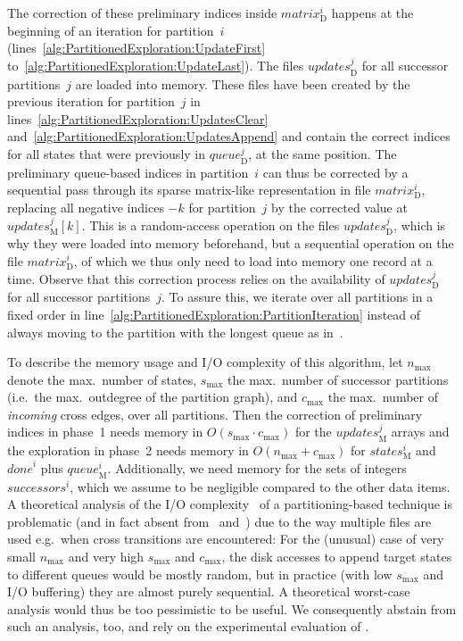 \documentclass{llncs}
\newcommand{\eg}{e.g.\ }
\newcommand{\ie}{i.e.\ }
\begin{document}
The correction of these preliminary indices inside $\mathit{matrix}_\mathrm{D}^i$ happens at the beginning of an iteration for partition~$i$ (lines~\ref{alg:PartitionedExploration:UpdateFirst} to~\ref{alg:PartitionedExploration:UpdateLast}).
The files $\mathit{updates}_\mathrm{D}^j$ for all successor partitions~$j$ are loaded into memory.
These files have been created by the previous iteration for partition~$j$ in lines~\ref{alg:PartitionedExploration:UpdatesClear} and~\ref{alg:PartitionedExploration:UpdatesAppend} and contain the correct indices for all states that were previously in $\mathit{queue}_\mathrm{D}^j$, at the same position.
The preliminary queue-based indices in partition~$i$ can thus be corrected by a sequential pass through its sparse matrix-like representation in file $\mathit{matrix}_\mathrm{D}^i$, replacing all negative indices $-k$ for partition~$j$ by the corrected value at $\mathit{updates}_\mathrm{M}^j[k]$.
This is a random-access operation on the files $\mathit{updates}_\mathrm{D}^j$, which is why they were loaded into memory beforehand, but a sequential operation on the file $\mathit{matrix}_\mathrm{D}^i$, of which we thus only need to load into memory one record at a time.
Observe that this correction process relies on the availability of $\mathit{updates}_\mathrm{D}^j$ for all successor partitions~$j$.
To assure this, we iterate over all partitions in a fixed order in line~\ref{alg:PartitionedExploration:PartitionIteration} instead of always moving to the partition with the longest queue as in~\cite{BJ05,EK13}.

To describe the memory usage and I/O complexity of this algorithm, let $n_{\max}$ denote the max.\ number of states, $s_{\max}$ the max.\ number of successor partitions (\ie the max.\ outdegree of the partition graph), and $c_{\max}$ the max.\ number of \emph{incoming} cross edges, over all partitions.
Then the correction of preliminary indices in phase~1 needs memory in $O(s_{\max} \cdot c_{\max})$ for the $\mathit{updates}_\mathrm{M}^j$ arrays and the exploration in phase~2 needs memory in $O(n_{\max} + c_{\max})$ for $\mathit{states}_\mathrm{M}^i$ and $\mathit{done}^i$ plus $\mathit{queue}_\mathrm{M}^i$.
Additionally, we need memory for the sets of integers $\mathit{successors}^i$, which we assume to be negligible compared to the other data items.
A theoretical analysis of the I/O complexity~\cite{AV88} of a partitioning-based technique is problematic (and in fact absent from~\cite{BJ05} and~\cite{EK13}) due to the way multiple files are used \eg when cross transitions are encountered:
For the (unusual)  case of very small $n_{\max}$ and very high $s_{\max}$ and $c_{\max}$, the disk accesses to append target states to different queues would be mostly random, but in practice (with low $s_{\max}$ and I/O buffering) they are almost purely sequential.
A theoretical worst-case analysis would thus be too pessimistic to be useful.
We consequently abstain from such an analysis, too, and rely on the experimental evaluation of .
\end{document}
